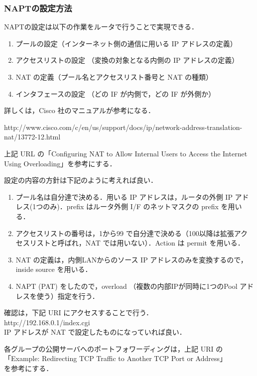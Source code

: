 \subsubsection{NAPTの設定方法}

NAPTの設定は以下の作業をルータで行うことで実現できる．

\begin{enumerate}
 \item プールの設定（インターネット側の通信に用いる IP アドレスの定義）
 \item アクセスリストの設定 （変換の対象となる内側の IP アドレスの定義）
 \item NAT の定義（プール名とアクセスリスト番号と NAT の種類）
 \item インタフェースの設定 （どの IF が内側で，どの IF が外側か）
\end{enumerate}

詳しくは，Cisco 社のマニュアルが参考になる．

http://www.cisco.com/c/en/us/support/docs/ip/network-address-translation-nat/13772-12.html

上記 URL の「Configuring NAT to Allow Internal Users to Access the Internet Using Overloading」を参考にする．

設定の内容の方針は下記のように考えれば良い．
\begin{enumerate}
 \item プール名は自分達で決める．用いる IP アドレスは，ルータの外側 IP
       アドレス(1つのみ)．prefix はルータ外側 I/F のネットマスクの
       prefix を用いる．
 \item アクセスリストの番号は，1から99 で自分達で決める（100以降は拡張アク
       セスリストと呼ばれ，NAT では用いない）．Action は permit を用いる．
 \item NAT の定義は，内側LANからのソース IP アドレスのみを変換するので，inside source を用いる．
 \item NAPT (PAT) をしたので，overload （複数の内部IPが同時に1つのPool アドレスを使う）指定を行う．
\end{enumerate}

確認は，下記 URI にアクセスすることで行う．\\
http://192.168.0.1/index.cgi\\
IP アドレスが NAT で設定したものになっていれば良い．

各グループの公開サーバへのポートフォワーディングは，上記 URI の\\
「Example: Redirecting TCP Traffic to Another TCP Port or Address」\\
を参考にする．

